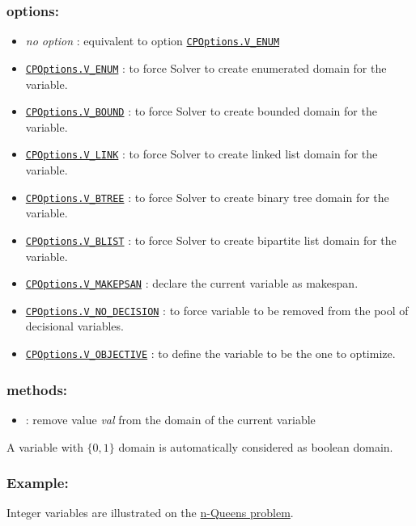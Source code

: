 \subsubsection{options:}
	\begin{itemize}
		\item \emph{no option} : equivalent to option \hyperlink{venum:venumoptions}{\tt CPOptions.V\_ENUM}
		\item \hyperlink{venum:venumoptions}{\tt CPOptions.V\_ENUM} : to force Solver to create enumerated domain for the variable.
		\item \hyperlink{vbound:vboundoptions}{\tt CPOptions.V\_BOUND} : to force Solver to create bounded domain for the variable.
		\item \hyperlink{vlink:vlinkoptions}{\tt CPOptions.V\_LINK} : to force Solver to create linked list domain for the variable.
		\item \hyperlink{vbtree:vbtreeoptions}{\tt CPOptions.V\_BTREE} : to force Solver to create binary tree domain for the variable.
		\item \hyperlink{vblist:vblistoptions}{\tt CPOptions.V\_BLIST} : to force Solver to create bipartite list domain for the variable.
		\item \hyperlink{vmakespan:vmakespanoptions}{\tt CPOptions.V\_MAKEPSAN} : declare the current variable as makespan.
		\item \hyperlink{vnodecision:vnodecisionoptions}{\tt CPOptions.V\_NO\_DECISION} : to force variable to be removed from the pool of decisional variables.
		\item \hyperlink{vobjective:vobjectiveoptions}{\tt CPOptions.V\_OBJECTIVE} : to define the variable to be the one to optimize.
	\end{itemize}
\subsubsection{methods:}
      \begin{itemize}
      \item {}: remove value \emph{val} from the domain of the current variable
      \end{itemize}

A variable with $\{0,1\}$ domain is automatically considered as boolean domain.

\subsubsection{Example:}


Integer variables are illustrated on the \hyperlink{model:example1:nqueenschoco}{n-Queens problem}. 
